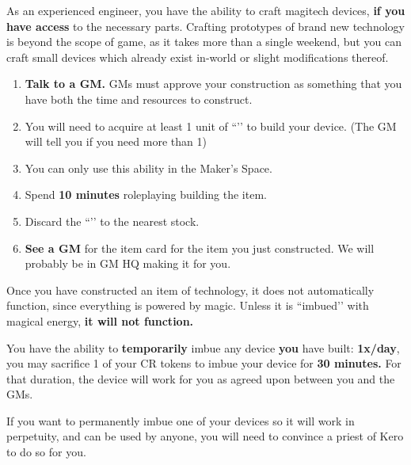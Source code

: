 \documentclass[green]{GL2020}
\begin{document}
\name{\gMagitechCrafting{}}

As an experienced engineer, you have the ability to craft magitech devices, \textbf{if you have access} to the necessary parts. Crafting prototypes of brand new technology is beyond the scope of game, as it takes more than a single weekend, but you can craft small devices which already exist in-world or slight modifications thereof. 

\begin{enumerate}
  \item \textbf{Talk to a GM.} GMs must approve your construction as something that you have both the time and resources to construct.
  \item You will need to acquire at least 1 unit of ``\iMagitechParts{}’’ to build your device. (The GM will tell you if you need more than 1) 
  \item You can only use this ability in the Maker’s Space. 
  \item Spend \textbf{10 minutes} roleplaying building the item. 
  \item Discard the ``\iMagitechParts{}’’ to the nearest stock. 
  \item \textbf{See a GM} for the item card for the item you just constructed. We will probably be in GM HQ making it for you.
\end{enumerate}

Once you have constructed an item of technology, it does not automatically function, since everything is powered by magic. Unless it is ``imbued’’ with magical energy, \textbf{it will not function.}

You have the ability to \textbf{temporarily} imbue any device \textbf{you} have built: \textbf{1x/day}, you may sacrifice 1 of your CR tokens to imbue your device for \textbf{30 minutes.} For that duration, the device will work for you as agreed upon between you and the GMs.

If you want to permanently imbue one of your devices so it will work in perpetuity, and can be used by anyone, you will need to convince a priest of Kero to do so for you.
\end{document}
